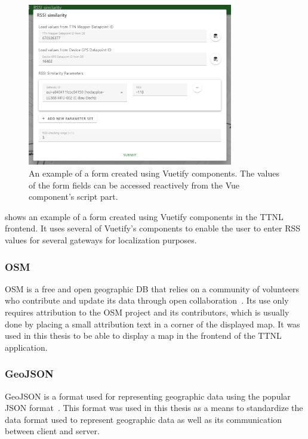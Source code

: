 \begin{figure}[htbp]
    \centering
    \includegraphics[width=0.8\textwidth]{pictures/ttn-locator/frontend/vuetify-form-example.png}
    \caption{
        An example of a form created using Vuetify components.
        The values of the form fields can be accessed reactively from the Vue component's script part.
    }\label{fig:vuetify-form-example}
\end{figure}

 shows an example of a form created using Vuetify components in the \ac{TTNL} frontend.
It uses several of Vuetify's components to enable the user to enter \ac{RSS} values for several gateways for localization purposes.

\subsubsection{\acf{OSM}}\label{sec:osm}

\ac{OSM} is a free and open geographic \ac{DB} that relies on a community of volunteers who contribute and update its data through open collaboration~\cite{openstreetmap_contributors_openstreetmap_2023}.
Its use only requires attribution to the \ac{OSM} project and its contributors, which is usually done by placing a small attribution text in a corner of the displayed map.
It was used in this thesis to be able to display a map in the frontend of the \ac{TTNL} application.

\subsubsection{GeoJSON}\label{sec:geojson}

GeoJSON is a format used for representing geographic data using the popular \ac{JSON} format~\cite{butler_geojson_2016}.
This format was used in this thesis as a means to standardize the data format used to represent geographic data as well as its communication between client and server.

